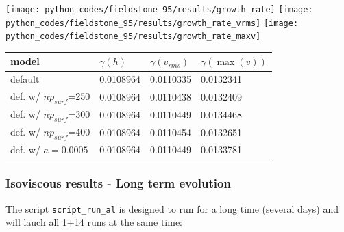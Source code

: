 \begin{center}
\texttt{[image: python\_codes/fieldstone\_95/results/growth\_rate]}
\texttt{[image: python\_codes/fieldstone\_95/results/growth\_rate\_vrms]}
\texttt{[image: python\_codes/fieldstone\_95/results/growth\_rate\_maxv]}
\end{center}


\begin{center}
\begin{tabular}{llll}
\hline
model    & $\gamma(h)$ & $\gamma(v_{rms})$ & $\gamma(\max(v))$ \\
\hline
\hline
default                 & 0.0108964 & 0.0110335& 0.0132341 \\
def. w/ $np_{surf}$=250 & 0.0108964 & 0.0110438& 0.0132409\\
def. w/ $np_{surf}$=300 & 0.0108964 & 0.0110449& 0.0134468\\
def. w/ $np_{surf}$=400 & 0.0108964 & 0.0110454& 0.0132651\\  
def. w/ $a=0.0005$      & 0.0108964 & 0.0110449& 0.0133781\\
\hline
\end{tabular}
\end{center}

\subsubsection*{Isoviscous results - Long term evolution}

The script {\tt script\_run\_al} is designed to run for a long time (several days) 
and will lauch all 1+14 runs at the same time: 

